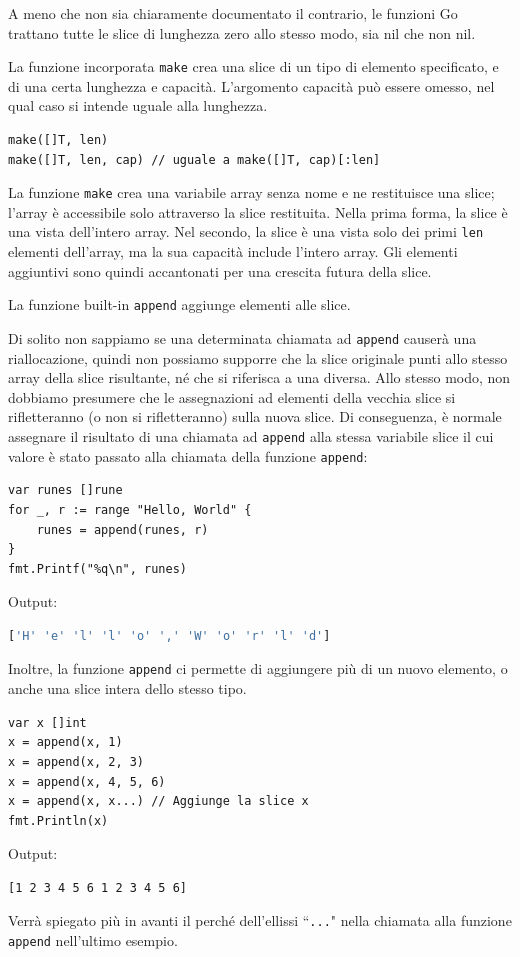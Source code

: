 \documentclass[../../thesis.tex]{subfiles}
\begin{document}
    A meno che non sia chiaramente documentato il contrario, le funzioni Go trattano tutte le slice di lunghezza zero allo stesso modo, sia nil che non nil.
    \hfill \vspace{12pt}

    La funzione incorporata \verb"make" crea una slice di un tipo di elemento specificato, e di una certa lunghezza e capacità.
    L'argomento capacità può essere omesso, nel qual caso si intende uguale alla lunghezza.
    \begin{lstlisting}[frame = single,label={lst:lstlisting3-2.7}]
make([]T, len)
make([]T, len, cap) // uguale a make([]T, cap)[:len]
    \end{lstlisting}
    La funzione \verb"make" crea una variabile array senza nome e ne restituisce una slice;
    l'array è accessibile solo attraverso la slice restituita.
    Nella prima forma, la slice è una vista dell'intero array.
    Nel secondo, la slice è una vista solo dei primi \verb"len" elementi dell'array, ma la sua capacità include l'intero array.
    Gli elementi aggiuntivi sono quindi accantonati per una crescita futura della slice.
    \hfill \vspace{12pt}

    La funzione built-in \verb"append" aggiunge elementi alle slice.

    Di solito non sappiamo se una determinata chiamata ad \verb"append" causerà una riallocazione, quindi non possiamo supporre che la slice originale punti allo stesso array della slice risultante, né che si riferisca a una diversa.
    Allo stesso modo, non dobbiamo presumere che le assegnazioni ad elementi della vecchia slice si rifletteranno (o non si rifletteranno) sulla nuova slice.
    Di conseguenza, è normale assegnare il risultato di una chiamata ad \verb"append" alla stessa variabile slice il cui valore è stato passato alla chiamata della funzione \verb"append":
    \begin{lstlisting}[frame = single,label={lst:lstlisting3-2.8}]
var runes []rune
for _, r := range "Hello, World" {
    runes = append(runes, r)
}
fmt.Printf("%q\n", runes)
    \end{lstlisting}
    Output:
    \begin{lstlisting}[language = bash, frame = L,label={lst:lstlisting3-2.9}]
['H' 'e' 'l' 'l' 'o' ',' 'W' 'o' 'r' 'l' 'd']
    \end{lstlisting}
    Inoltre, la funzione \verb"append" ci permette di aggiungere più di un nuovo elemento, o anche una slice intera dello stesso tipo.
    \begin{lstlisting}[frame = single,label={lst:lstlisting3-2.10}]
var x []int
x = append(x, 1)
x = append(x, 2, 3)
x = append(x, 4, 5, 6)
x = append(x, x...) // Aggiunge la slice x
fmt.Println(x)
    \end{lstlisting}
    Output:
    \begin{lstlisting}[language = bash, frame = L,label={lst:lstlisting3-2.11}]
[1 2 3 4 5 6 1 2 3 4 5 6]
    \end{lstlisting}
    Verrà spiegato più in avanti il perché dell'ellissi ``\verb"..."" nella chiamata alla funzione \verb"append" nell'ultimo esempio.
    \hfill \vspace{12pt}
\end{document}
